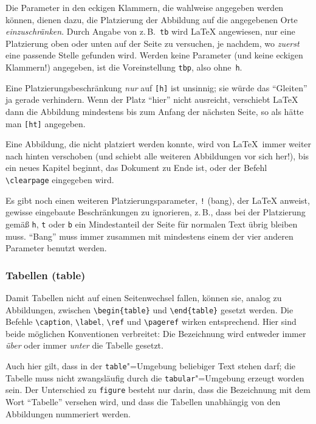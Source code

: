 Die Parameter in den eckigen Klammern, die wahlweise angegeben
werden können, dienen dazu, die Platzierung der Abbildung auf die
angegebenen Orte \emph{einzuschränken}.  Durch Angabe von
z.\,B.\ \texttt{tb}
wird \LaTeX{} angewiesen, nur eine Platzierung oben oder unten auf der
Seite zu versuchen, je nachdem,
wo \emph{zuerst} eine passende Stelle gefunden wird.
Werden keine Parameter (und keine eckigen
Klammern!) angegeben, ist die Voreinstellung \texttt{tbp},
also ohne~\texttt{h}.

Eine Platzierungsbeschränkung \emph{nur} auf \texttt{[h]} ist unsinnig;
sie würde das "`Gleiten"' ja gerade verhindern.
Wenn der Platz "`hier"' nicht ausreicht, 
verschiebt \LaTeX{} dann die Abbildung mindestens 
bis zum Anfang der nächsten Seite, so als hätte man \texttt{[ht]} angegeben.

Eine Abbildung, die nicht platziert werden konnte, wird von
\LaTeX\ immer weiter nach hinten verschoben (und schiebt alle
weiteren Abbildungen vor sich her!), bis ein neues Kapitel
beginnt, das Dokument zu Ende ist, oder der Befehl
\lstinline|\clearpage| eingegeben wird.  


Es gibt noch einen weiteren Platzierungsparameter, 
\texttt{!} (bang), der \LaTeX{} anweist,
gewisse eingebaute Beschränkungen zu ignorieren, 
z.\,B., dass bei der Platzierung gemäß \texttt{h}, \texttt{t} oder \texttt{b}
ein Mindestanteil der Seite für normalen Text übrig bleiben muss.
"`Bang"' muss immer zusammen mit mindestens einem der vier
anderen Parameter benutzt werden.  
 


\subsubsection{Tabellen (table)}

Damit Tabellen nicht auf einen Seitenwechsel fallen,
können sie, analog zu Abbildungen, zwischen
\lstinline|\begin{table}| und \lstinline|\end{table}| gesetzt werden.
Die Befehle
\lstinline|\caption|, \lstinline|\label|, \lstinline|\ref| und \lstinline|\pageref|
wirken entsprechend.
Hier sind beide möglichen Konventionen verbreitet: Die
Bezeichnung wird entweder immer \emph{über} oder immer
\emph{unter} die Tabelle gesetzt.

Auch hier gilt, dass in der \texttt{table}"=Umgebung  beliebiger
Text stehen darf; die Tabelle muss nicht zwangsläufig durch die
\texttt{tabular}"=Umgebung erzeugt worden sein.
Der Unterschied zu \texttt{figure} besteht nur darin, 
dass die Bezeichnung mit dem Wort "`Tabelle"' versehen wird,
und dass die Tabellen unabhängig von den Abbildungen nummeriert werden.

\endinput
